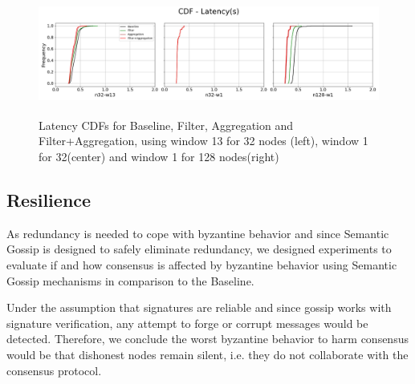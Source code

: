 \begin{figure}[htbp]
\centering
\includegraphics[width=\textwidth, height=4cm]{figures/cdfs.png}
\caption{Latency CDFs for Baseline, Filter, Aggregation and Filter+Aggregation, using window 13 for 32 nodes (left), window 1 for 32(center) and window 1 for 128 nodes(right)}
\label{fig:cdfs}
\end{figure}




\subsection{Resilience}
\label{sec:resilience}

As redundancy is needed to cope with byzantine behavior and since Semantic Gossip is designed to safely eliminate redundancy, we designed experiments to evaluate if and how consensus is affected by byzantine behavior using Semantic Gossip mechanisms in comparison to the Baseline.

Under the assumption that signatures are reliable and since gossip works with signature verification, any attempt to forge or corrupt messages would be detected.   Therefore, we conclude the worst byzantine behavior to harm consensus would be that dishonest nodes remain silent, i.e. they do not collaborate with the consensus protocol.

